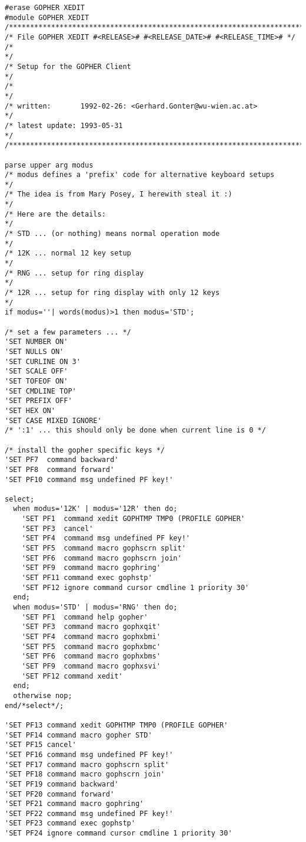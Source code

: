 \begin{verbatim}
#erase GOPHER XEDIT
#module GOPHER XEDIT
/***********************************************************************/
/* File GOPHER XEDIT #<RELEASE># #<RELEASE_DATE># #<RELEASE_TIME># */
/*                                                                     */
/* Setup for the GOPHER Client                                         */
/*                                                                     */
/* written:       1992-02-26: <Gerhard.Gonter@wu-wien.ac.at>           */
/* latest update: 1993-05-31                                           */
/***********************************************************************/

parse upper arg modus
/* modus defines a 'prefix' code for alternative keyboard setups       */
/* The idea is from Mary Posey, I herewith steal it :)                 */
/* Here are the details:                                               */
/* STD ... (or nothing) means normal operation mode                    */
/* 12K ... normal 12 key setup                                         */
/* RNG ... setup for ring display                                      */
/* 12R ... setup for ring display with only 12 keys                    */
if modus=''| words(modus)>1 then modus='STD';

/* set a few parameters ... */
'SET NUMBER ON'
'SET NULLS ON'
'SET CURLINE ON 3'
'SET SCALE OFF'
'SET TOFEOF ON'
'SET CMDLINE TOP'
'SET PREFIX OFF'
'SET HEX ON'
'SET CASE MIXED IGNORE'
/* ':1' ... this should only be done when current line is 0 */

/* install the gopher specific keys */
'SET PF7  command backward'
'SET PF8  command forward'
'SET PF10 command msg undefined PF key!'

select;
  when modus='12K' | modus='12R' then do;
    'SET PF1  command xedit GOPHTMP TMP0 (PROFILE GOPHER'
    'SET PF3  cancel'
    'SET PF4  command msg undefined PF key!'
    'SET PF5  command macro gophscrn split'
    'SET PF6  command macro gophscrn join'
    'SET PF9  command macro gophring'
    'SET PF11 command exec gophstp'
    'SET PF12 ignore command cursor cmdline 1 priority 30'
  end;
  when modus='STD' | modus='RNG' then do;
    'SET PF1  command help gopher'
    'SET PF3  command macro gophxqit'
    'SET PF4  command macro gophxbmi'
    'SET PF5  command macro gophxbmc'
    'SET PF6  command macro gophxbms'
    'SET PF9  command macro gophxsvi'
    'SET PF12 command xedit'
  end;
  otherwise nop;
end/*select*/;

'SET PF13 command xedit GOPHTMP TMP0 (PROFILE GOPHER'
'SET PF14 command macro gopher STD'
'SET PF15 cancel'
'SET PF16 command msg undefined PF key!'
'SET PF17 command macro gophscrn split'
'SET PF18 command macro gophscrn join'
'SET PF19 command backward'
'SET PF20 command forward'
'SET PF21 command macro gophring'
'SET PF22 command msg undefined PF key!'
'SET PF23 command exec gophstp'
'SET PF24 ignore command cursor cmdline 1 priority 30'


\end{verbatim}
